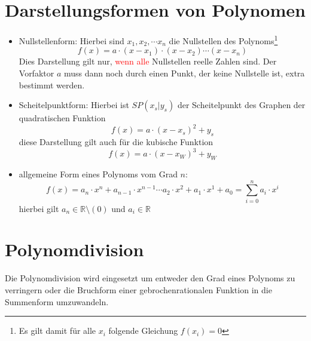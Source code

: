 \section{Darstellungsformen von Polynomen}
\begin{itemize}
    \item Nullstellenform: Hierbei sind $x_1, x_2, \cdots x_n$ die Nullstellen des Polynoms\footnote{Es gilt damit für alle $x_i$ folgende Gleichung $f(x_i) = 0$} $$f(x) = a\cdot (x-x_1)\cdot (x-x_2) \cdots (x-x_n)$$
    Dies Darstellung gilt nur, \textcolor{red}{wenn alle} Nullstellen reelle Zahlen sind. Der Vorfaktor $a$ muss dann noch durch einen Punkt, der keine Nullstelle ist, extra bestimmt werden.
    \item Scheitelpunktform: Hierbei ist $SP(x_s|y_s)$ der Scheitelpunkt des Graphen der quadratischen Funktion $$f(x) = a\cdot (x-x_s)^2 +y_s$$ diese Darstellung gilt auch für die kubische Funktion $$f(x) = a\cdot (x-x_W)^3 +y_W$$ 
    \item allgemeine Form eines Polynoms vom Grad $n$: $$f(x) = a_n\cdot x^n + a_{n-1}\cdot x^{n-1} \cdots a_2\cdot x^2 + a_1\cdot x^1 + a_0 = \sum\limits_{i=0}^{n} a_i\cdot x^i$$ hierbei gilt $a_n \in \mathds{R}\setminus \left(0\right)$ und $a_i \in \mathds{R}$
\end{itemize}
\section{Polynomdivision}
Die Polynomdivision wird eingesetzt um entweder den Grad eines Polynoms zu verringern oder die Bruchform einer gebrochenrationalen Funktion in die Summenform umzuwandeln. 
